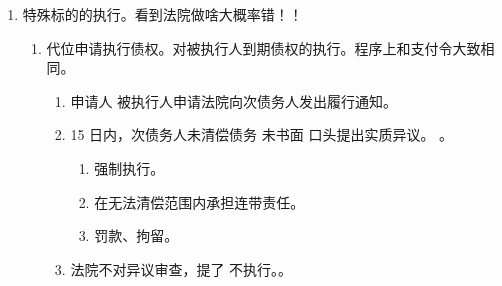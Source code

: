 \begin{enumerate}
\begin{enumerate}
                。
                。
                \begin{enumerate}
                  \item 被执行人为自然人或其他组织，而非法人。
                  \item 有多个申请人对同一被申请人享有到期债权，申请人已取得生效的执行依据。
                  \item 被执行人的财产无法清偿所有债权。
                  \item 债权为金钱债权 \hz 已经转化为金钱请求权的债权。
                  \item 执行程序开始后，被执行人财产被执行完毕之前。
                  \item 分配方案。债权人、被执行人有权提出异议 \yjt 通知没提异议的人 \yjt ... \yjt 修订方案 \yjt 有人反对 \yjt
                        分配方案异议之诉（异议者告反对者）。。
                  \item 不存在上诉、复议等问题。
                \end{enumerate}
          \item 执行转破产。不成功 \yjt 恢复执行 \yjt 查扣冻，先到先得。
        \end{enumerate}
  \item 特殊标的的执行。看到法院做啥大概率错！！
        \begin{enumerate}
          \item 代位申请执行债权。对被执行人到期债权的执行。程序上和支付令大致相同。
                \begin{enumerate}
                  \item 申请人 \hz 被执行人申请法院向次债务人发出履行通知。
                  \item 15 日内，次债务人未清偿债务 \hz 未书面 \hz 口头提出实质异议。
                        。
                        \begin{enumerate}
                          \item 强制执行。
                          \item 在无法清偿范围内承担连带责任。
                          \item 罚款、拘留。
                        \end{enumerate}
                  \item 法院不对异议审查，提了 \yjt 不执行。。

\end{enumerate}
\end{enumerate}
\end{enumerate}
